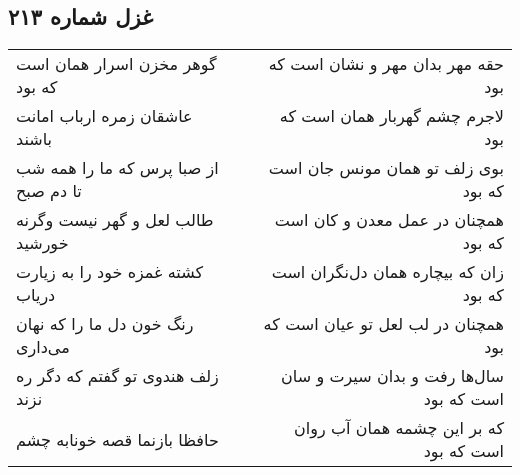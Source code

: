 \begin{center}
\section*{غزل شماره ۲۱۳}
\label{sec:sh213}
\begin{longtable}{l p{0.5cm} r}
گوهر مخزن اسرار همان است که بود
&&
حقه مهر بدان مهر و نشان است که بود
\\
عاشقان زمره ارباب امانت باشند
&&
لاجرم چشم گهربار همان است که بود
\\
از صبا پرس که ما را همه شب تا دم صبح
&&
بوی زلف تو همان مونس جان است که بود
\\
طالب لعل و گهر نیست وگرنه خورشید
&&
همچنان در عمل معدن و کان است که بود
\\
کشته غمزه خود را به زیارت دریاب
&&
زان که بیچاره همان دل‌نگران است که بود
\\
رنگ خون دل ما را که نهان می‌داری
&&
همچنان در لب لعل تو عیان است که بود
\\
زلف هندوی تو گفتم که دگر ره نزند
&&
سال‌ها رفت و بدان سیرت و سان است که بود
\\
حافظا بازنما قصه خونابه چشم
&&
که بر این چشمه همان آب روان است که بود
\\
\end{longtable}
\end{center}
